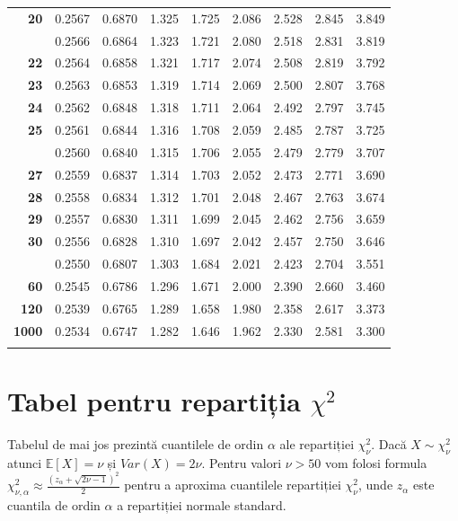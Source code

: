 \documentclass[]{article}
\begin{document}
\begin{longtable}{>{\bfseries}r|rrrrrrrr}
20 & 0.2567 & 0.6870 & 1.325 & 1.725 & 2.086 & 2.528 & 2.845 & 3.849\\
\addlinespace
21 & 0.2566 & 0.6864 & 1.323 & 1.721 & 2.080 & 2.518 & 2.831 & 3.819\\
22 & 0.2564 & 0.6858 & 1.321 & 1.717 & 2.074 & 2.508 & 2.819 & 3.792\\
23 & 0.2563 & 0.6853 & 1.319 & 1.714 & 2.069 & 2.500 & 2.807 & 3.768\\
24 & 0.2562 & 0.6848 & 1.318 & 1.711 & 2.064 & 2.492 & 2.797 & 3.745\\
25 & 0.2561 & 0.6844 & 1.316 & 1.708 & 2.059 & 2.485 & 2.787 & 3.725\\
\addlinespace
26 & 0.2560 & 0.6840 & 1.315 & 1.706 & 2.055 & 2.479 & 2.779 & 3.707\\
27 & 0.2559 & 0.6837 & 1.314 & 1.703 & 2.052 & 2.473 & 2.771 & 3.690\\
28 & 0.2558 & 0.6834 & 1.312 & 1.701 & 2.048 & 2.467 & 2.763 & 3.674\\
29 & 0.2557 & 0.6830 & 1.311 & 1.699 & 2.045 & 2.462 & 2.756 & 3.659\\
30 & 0.2556 & 0.6828 & 1.310 & 1.697 & 2.042 & 2.457 & 2.750 & 3.646\\
\addlinespace
40 & 0.2550 & 0.6807 & 1.303 & 1.684 & 2.021 & 2.423 & 2.704 & 3.551\\
60 & 0.2545 & 0.6786 & 1.296 & 1.671 & 2.000 & 2.390 & 2.660 & 3.460\\
120 & 0.2539 & 0.6765 & 1.289 & 1.658 & 1.980 & 2.358 & 2.617 & 3.373\\
1000 & 0.2534 & 0.6747 & 1.282 & 1.646 & 1.962 & 2.330 & 2.581 & 3.300\\*
\end{longtable}

\endgroup{}

\section{\texorpdfstring{Tabel pentru repartiția
\(\chi^2\)}{Tabel pentru repartiția \textbackslash{}chi\^{}2}}\label{tabel-pentru-repartitia-chi2}

Tabelul de mai jos prezintă cuantilele de ordin \(\alpha\) ale
repartiției \(\chi^2_{\nu}\). Dacă \(X\sim \chi^2_{\nu}\) atunci
\(\mathbb{E}[X]=\nu\) și \(Var(X) = 2\nu\). Pentru valori \(\nu>50\) vom
folosi formula
\(\chi^2_{\nu,\alpha} \approx \frac{(z_{\alpha}+\sqrt{2\nu-1})^2}{2}\)
pentru a aproxima cuantilele repartiției \(\chi^2_{\nu}\), unde
\(z_{\alpha}\) este cuantila de ordin \(\alpha\) a repartiției normale
standard.
\end{document}
